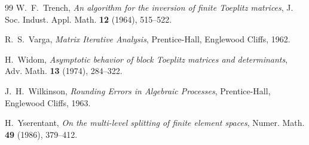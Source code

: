 \documentclass[11pt,a4paper]{article}
\theoremstyle{plain}
\theoremstyle{definition}
\begin{document}
\begin{thebibliography}{99}
 W.~F.~Trench,
\emph{An algorithm for the inversion of finite Toeplitz matrices},
J. Soc. Indust. Appl. Math. \textbf{12} (1964), 515--522.

 R.~S.~Varga,
\emph{Matrix Iterative Analysis},
Prentice-Hall, Englewood Cliffs, 1962.

 H.~Widom,
\emph{Asymptotic behavior of block Toeplitz matrices and determinants},
Adv. Math. \textbf{13} (1974), 284--322.

 J.~H.~Wilkinson,
\emph{Rounding Errors in Algebraic Processes},
Prentice-Hall, Englewood Cliffs, 1963.

 H.~Yserentant,
\emph{On the multi-level splitting of finite element spaces},
Numer. Math. \textbf{49} (1986), 379--412.

\end{thebibliography}
\end{document}
